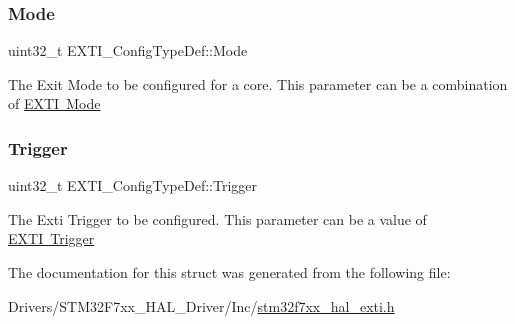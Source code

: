 \subsubsection{\texorpdfstring{Mode}{Mode}}
{\footnotesize\ttfamily uint32\+\_\+t E\+X\+T\+I\+\_\+\+Config\+Type\+Def\+::\+Mode}

The Exit Mode to be configured for a core. This parameter can be a combination of \mbox{\hyperlink{group___e_x_t_i___mode}{E\+X\+TI Mode}} \mbox{\label{struct_e_x_t_i___config_type_def_acf6d2ea84df5f2b705676584ae00707a}} 
\subsubsection{\texorpdfstring{Trigger}{Trigger}}
{\footnotesize\ttfamily uint32\+\_\+t E\+X\+T\+I\+\_\+\+Config\+Type\+Def\+::\+Trigger}

The Exti Trigger to be configured. This parameter can be a value of \mbox{\hyperlink{group___e_x_t_i___trigger}{E\+X\+TI Trigger}} 

The documentation for this struct was generated from the following file\+:\begin{DoxyCompactItemize}
\item 
Drivers/\+S\+T\+M32\+F7xx\+\_\+\+H\+A\+L\+\_\+\+Driver/\+Inc/\mbox{\hyperlink{stm32f7xx__hal__exti_8h}{stm32f7xx\+\_\+hal\+\_\+exti.\+h}}\end{DoxyCompactItemize}
